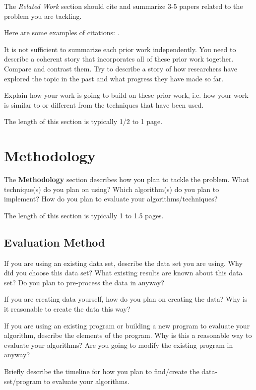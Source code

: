 \documentclass[letterpaper]{article} %
\begin{document}
The {\it Related Work} section should cite and summarize 3-5 papers related to the problem you are tackling.   

Here are some examples of citations: \cite{russell2016artificial,gao2016incentivizing,gao2014trick}.  

It is not sufficient to summarize each prior work independently.  You need to describe a coherent story that incorporates all of these prior work together.  Compare and contrast them.  Try to describe a story of how researchers have explored the topic in the past and what progress they have made so far.  

Explain how your work is going to build on these prior work, i.e. how your work is similar to or different from the techniques that have been used.  

The length of this section is typically 1/2 to 1 page.


\section{Methodology}

The {\bf Methodology} section describes how you plan to tackle the problem.  What technique(s) do you plan on using?   Which algorithm(s) do you plan to implement?  How do you plan to evaluate your algorithms/techniques?

The length of this section is typically 1 to 1.5 pages.

\subsection{Evaluation Method}

If you are using an existing data set, describe the data set you are using.  Why did you choose this data set?  What existing results are known about this data set?  Do you plan to pre-process the data in anyway? 

If you are creating data yourself, how do you plan on creating the data?  Why is it reasonable to create the data this way?  

If you are using an existing program or building a new program to evaluate your algorithm, describe the elements of the program.  Why is this a reasonable way to evaluate your algorithms?  Are you going to modify the existing program in anyway?  

Briefly describe the timeline for how you plan to find/create the data-set/program to evaluate your algorithms. 
\end{document}
